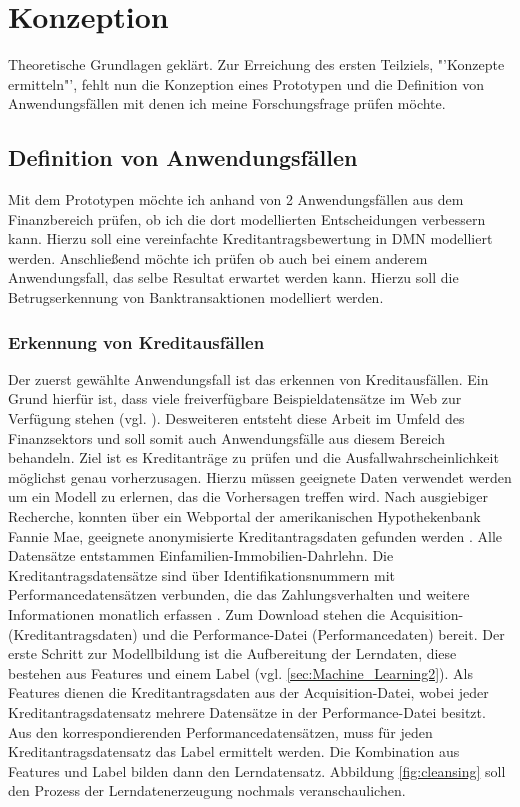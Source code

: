 \chapter{Konzeption}
\label{ch:Konzeption3}

Theoretische Grundlagen geklärt. Zur Erreichung des ersten Teilziels, "'Konzepte ermitteln"', fehlt nun die Konzeption eines Prototypen und die Definition von Anwendungsfällen mit denen ich meine Forschungsfrage prüfen möchte.

\section{Definition von Anwendungsfällen}
\label{sec:Anwendungsfalle3}

Mit dem Prototypen möchte ich anhand von 2 Anwendungsfällen aus dem Finanzbereich prüfen, ob ich die dort modellierten Entscheidungen verbessern kann. Hierzu soll eine vereinfachte Kreditantragsbewertung in DMN modelliert werden. Anschließend möchte ich prüfen ob auch bei einem anderem Anwendungsfall, das selbe Resultat erwartet werden kann. Hierzu soll die Betrugserkennung von Banktransaktionen modelliert werden.   

\subsection{Erkennung von Kreditausfällen}
\label{subsec:Kreditausfallen3}

Der zuerst gewählte Anwendungsfall ist das erkennen von Kreditausfällen. Ein Grund hierfür ist, dass viele freiverfügbare Beispieldatensätze im Web zur Verfügung stehen (vgl. \cite[]{KG1, KG2, UIC1}). Desweiteren entsteht diese Arbeit im Umfeld des Finanzsektors und soll somit auch Anwendungsfälle aus diesem Bereich behandeln. Ziel ist es Kreditanträge zu prüfen und die Ausfallwahrscheinlichkeit möglichst genau vorherzusagen. Hierzu müssen geeignete Daten verwendet werden um ein Modell zu erlernen, das die Vorhersagen treffen wird. Nach ausgiebiger Recherche, konnten über ein Webportal der amerikanischen Hypothekenbank Fannie Mae, geeignete anonymisierte Kreditantragsdaten gefunden werden \cite{FM17}. Alle Datensätze entstammen Einfamilien-Immobilien-Dahrlehn. Die Kreditantragsdatensätze sind über Identifikationsnummern mit Performancedatensätzen verbunden, die das Zahlungsverhalten und weitere Informationen monatlich erfassen \cite{FM18}. Zum Download stehen die Acquisition- (Kreditantragsdaten) und die Performance-Datei (Performancedaten) bereit. Der erste Schritt zur Modellbildung ist die Aufbereitung der Lerndaten, diese bestehen aus Features und einem Label (vgl. \ref{sec:Machine_Learning2}).     
Als Features dienen die Kreditantragsdaten aus der Acquisition-Datei, wobei jeder Kreditantragsdatensatz mehrere Datensätze in der Performance-Datei besitzt. Aus den korrespondierenden Performancedatensätzen, muss für jeden Kreditantragsdatensatz das Label ermittelt werden. Die Kombination aus Features und Label bilden dann den Lerndatensatz. Abbildung \ref{fig:cleansing} soll den Prozess der Lerndatenerzeugung nochmals veranschaulichen.

